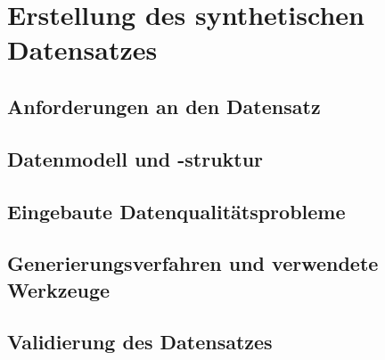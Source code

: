 
\chapter{Erstellung des synthetischen Datensatzes}
\label{ch:datensatz}

\section{Anforderungen an den Datensatz}
\label{sec:datensatz-anforderungen}

\section{Datenmodell und -struktur}
\label{sec:datenmodell}

\section{Eingebaute Datenqualitätsprobleme}
\label{sec:eingebaute-probleme}

\section{Generierungsverfahren und verwendete Werkzeuge}
\label{sec:generierung}

\section{Validierung des Datensatzes}
\label{sec:datensatz-validierung}
